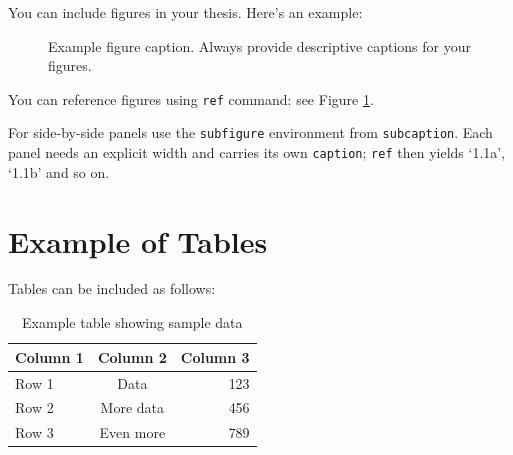 You can include figures in your thesis. Here's an example:

\begin{figure}[h]
    \centering
    \caption{Example figure caption. Always provide descriptive captions for your figures.}
    \label{fig:example}
\end{figure}

You can reference figures using \texttt{ref} command: see Figure \ref{fig:example}.

For side-by-side panels use the \texttt{subfigure} environment from
\texttt{subcaption}. Each panel needs an explicit width and carries its own
\texttt{caption}; \texttt{ref} then yields `1.1a', `1.1b' and so on.


\section{Example of Tables}

Tables can be included as follows:

\begin{table}[h]
\centering
\caption{Example table showing sample data}
\label{tab:example}
\begin{tabular}{|l|c|r|}
\hline
\textbf{Column 1} & \textbf{Column 2} & \textbf{Column 3} \\
\hline
Row 1 & Data & 123 \\
Row 2 & More data & 456 \\
Row 3 & Even more & 789 \\
\hline
\end{tabular}
\end{table}

